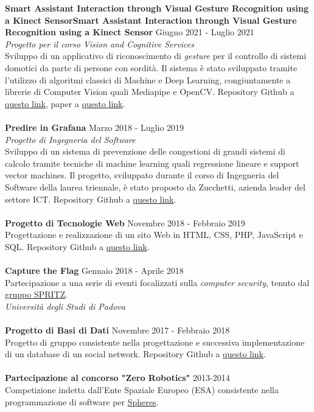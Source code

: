 \documentclass[margin, 10pt]{res}
\begin{document}
\begin{resume}
\textbf{Smart Assistant Interaction through Visual Gesture Recognition using a Kinect SensorSmart Assistant Interaction through Visual Gesture Recognition using a Kinect Sensor } \hfill Giugno 2021 - Luglio 2021 \\
\textit{Progetto per il corso Vision and Cognitive Services} \\
Sviluppo di un applicativo di riconoscimento di \textit{gesture} per il controllo di sistemi domotici da parte di persone con sordità. Il sistema è stato sviluppato tramite l'utilizzo di algoritmi classici di Machine e Deep Learning, congiuntamente a librerie di Computer Vision quali Mediapipe e OpenCV. Repository Github a \href{https://github.com/enricobu96/vcs-project}{questo link}, paper a \href{https://raw.githubusercontent.com/enricobu96/vcs-project/master/extra/paper/VCS-project_Buratto-Sciacco.pdf}{questo link}.\\ \\
\textbf{Predire in Grafana} \hfill Marzo 2018 - Luglio 2019 \\
\textit{Progetto di Ingegneria del Software} \\
Sviluppo di un sistema di prevenzione delle congestioni di grandi sistemi di calcolo tramite tecniche di machine learning quali regressione lineare e support vector machines. Il progetto, sviluppato durante il corso di Ingegneria del Software della laurea triennale, è stato proposto da Zucchetti, azienda leader del settore ICT. Repository Github a \href{https://github.com/CoffeeCodeSWE/swe-predire-in-grafana}{questo link}. \\ \\
\textbf{Progetto di Tecnologie Web} \hfill Novembre 2018 - Febbraio 2019 \\
Progettazione e realizzazione di un sito Web in HTML, CSS, PHP, JavaScript e SQL. Repository Github a \href{https://github.com/enricobu96/TecWebUNIPD}{questo link}. \\ \\
\textbf{Capture the Flag} \hfill Gennaio 2018 - Aprile 2018 \\
Partecipazione a una serie di eventi focalizzati sulla \textit{computer security}, tenuto dal \href{https://spritz.math.unipd.it/}{gruppo SPRITZ}. \\
\textit{Università degli Studi di Padova} \\ \\
\textbf{Progetto di Basi di Dati} \hfill Novembre 2017 - Febbraio 2018 \\
Progetto di gruppo consistente nella progettazione e successiva implementazione di un database di un social network. Repository Github a \href{https://github.com/enricobu96/DB1718}{questo link}. \\ \\
\textbf{Partecipazione al concorso "Zero Robotics"} \hfill 2013-2014 \\
Competizione indetta dall'Ente Spaziale Europeo (ESA) consistente nella programmazione di software per \href{https://www.esa.int/Science_Exploration/Human_and_Robotic_Exploration/Education/Robot_Spheres_in_zero-gravity_action}{Spheres}.


\end{resume}
\end{document}

